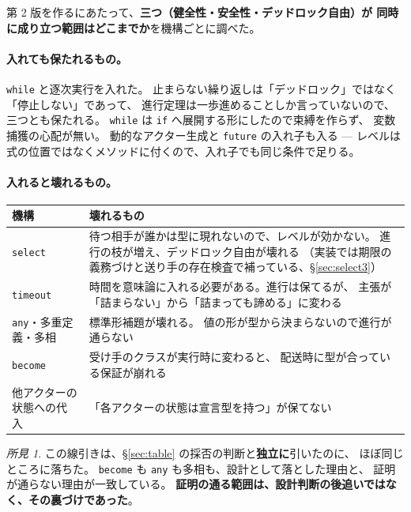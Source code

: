 \documentclass[11pt,a4paper]{ltjsarticle}
\theoremstyle{definition}
\theoremstyle{remark}
\newtheorem{finding}[theorem]{所見}
\begin{document}
第 2 版を作るにあたって、\textbf{三つ（健全性・安全性・デッドロック自由）が
同時に成り立つ範囲はどこまでか}を機構ごとに調べた。

\paragraph{入れても保たれるもの。}
\texttt{while} と逐次実行を入れた。
止まらない繰り返しは「デッドロック」ではなく「停止しない」であって、
進行定理は一歩進めることしか言っていないので、三つとも保たれる。
\texttt{while} は \texttt{if} へ展開する形にしたので束縛を作らず、
変数捕獲の心配が無い。
動的なアクター生成と \texttt{future} の入れ子も入る ---
レベルは式の位置ではなくメソッドに付くので、入れ子でも同じ条件で足りる。

\paragraph{入れると壊れるもの。}

\begin{center}
\small
\begin{tabular}{p{}p{}}
\toprule
機構 & 壊れるもの \\
\midrule
\texttt{select} & 待つ相手が誰かは型に現れないので、レベルが効かない。
  進行の枝が増え、デッドロック自由が壊れる
  （実装では期限の義務づけと送り手の存在検査で補っている、\S\ref{sec:select3}） \\
\texttt{timeout} & 時間を意味論に入れる必要がある。進行は保てるが、
  主張が「詰まらない」から「詰まっても諦める」に変わる \\
\texttt{any}・多重定義・多相 & 標準形補題が壊れる。
  値の形が型から決まらないので進行が通らない \\
\texttt{become} & 受け手のクラスが実行時に変わると、
  配送時に型が合っている保証が崩れる \\
他アクターの状態への代入 & 「各アクターの状態は宣言型を持つ」が保てない \\
\bottomrule
\end{tabular}
\end{center}

\begin{finding}
この線引きは、\S\ref{sec:table} の採否の判断と\textbf{独立に}引いたのに、
ほぼ同じところに落ちた。
\texttt{become} も \texttt{any} も多相も、設計として落とした理由と、
証明が通らない理由が一致している。
\textbf{証明の通る範囲は、設計判断の後追いではなく、その裏づけであった}。
\end{finding}
\end{document}
